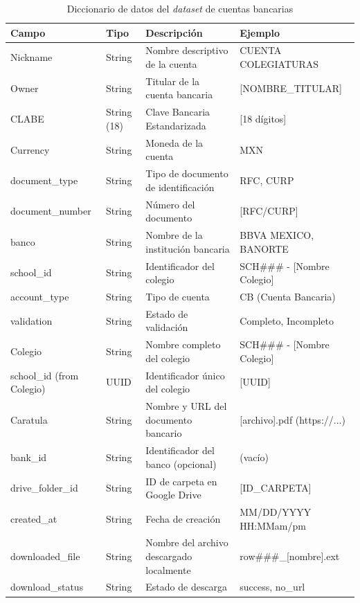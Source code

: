 \begin{table}[htbp]
\centering
\begin{tabular}{p{3cm} p{2cm} p{5cm} p{4cm}}
\toprule
\textbf{Campo} & \textbf{Tipo} & \textbf{Descripción} & \textbf{Ejemplo} \\
\midrule
Nickname & String & Nombre descriptivo de la cuenta & CUENTA COLEGIATURAS \\
Owner & String & Titular de la cuenta bancaria & [NOMBRE\_TITULAR] \\
CLABE & String (18) & Clave Bancaria Estandarizada & [18 dígitos] \\
Currency & String & Moneda de la cuenta & MXN \\
document\_type & String & Tipo de documento de identificación & RFC, CURP \\
document\_number & String & Número del documento & [RFC/CURP] \\
banco & String & Nombre de la institución bancaria & BBVA MEXICO, BANORTE \\
school\_id & String & Identificador del colegio & SCH\#\#\# - [Nombre Colegio] \\
account\_type & String & Tipo de cuenta & CB (Cuenta Bancaria) \\
validation & String & Estado de validación & Completo, Incompleto \\
Colegio & String & Nombre completo del colegio & SCH\#\#\# - [Nombre Colegio] \\
school\_id (from Colegio) & UUID & Identificador único del colegio & [UUID] \\
Caratula & String & Nombre y URL del documento bancario & [archivo].pdf (https://...) \\
bank\_id & String & Identificador del banco (opcional) & (vacío) \\
drive\_folder\_id & String & ID de carpeta en Google Drive & [ID\_CARPETA] \\
created\_at & String & Fecha de creación & MM/DD/YYYY HH:MMam/pm \\
downloaded\_file & String & Nombre del archivo descargado localmente & row\#\#\#\_[nombre].ext \\
download\_status & String & Estado de descarga & success, no\_url \\
\bottomrule
\end{tabular}
\caption{Diccionario de datos del \textit{dataset} de cuentas bancarias}
\label{tab:diccionario_datos}
\end{table}


